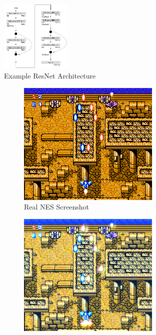 \documentclass[10pt,twocolumn,letterpaper]{article}
\begin{document}
\begin{figure}[H]
   \centering
   \includegraphics[width=0.3\textwidth, height=0.2426\textwidth]{figures/resnet_architecture.png}
   \caption{Example ResNet Architecture}
   \label{fig:resnet}
\end{figure}

\begin{figure}[H]
   \centering
   \begin{subfigure}[b]{0.235\textwidth}
      \includegraphics[width=\textwidth, height=0.8\textwidth]{figures/nes_to_snes/Crisis_Force_(J)__ucc__12_real_A.png}
      \caption{Real NES Screenshot}
      \label{fig:ss3a}
   \end{subfigure}
   \begin{subfigure}[b]{0.235\textwidth}
      \includegraphics[width=\textwidth, height=0.8\textwidth]{figures/nes_to_snes/Crisis_Force_(J)__ucc__12_fake_B.png}

\end{subfigure}
\end{figure}
\end{document}
